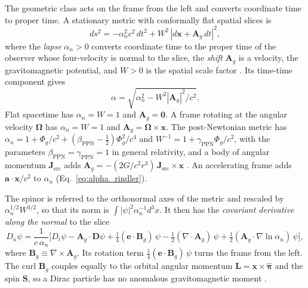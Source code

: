 \documentclass[aps,prd,onecolumn,tightenlines,nofootinbib,notitlepage,11pt,floatfix]{revtex4-2}
\theoremstyle{indentedtheorem}
\begin{document}
The geometric class acts on the frame from the left and converts coordinate time to proper time. A stationary metric with conformally flat spatial slices is
\begin{equation}
    ds^2 = -\alpha_n^2c^2\,dt^2 + W^2\,|d\mathbf{x}+\mathbf{A}_g\,dt|^2 ,
    \label{eq:lapse_shift_metric}
\end{equation}
where the \emph{lapse} $\alpha_n>0$ converts coordinate time to the proper time of the observer whose four-velocity is normal to the slice, the \emph{shift} $\mathbf{A}_g$ is a velocity, the gravitomagnetic potential, and $W>0$ is the spatial scale factor \citep{Arnowitt2008Dynamics,MTW1973Gravitation}. Its time-time component gives
\begin{equation}
    \alpha = \sqrt{\alpha_n^2 - W^2|\mathbf{A}_g|^2/c^2} .
    \label{eq:alpha_lapse_shift}
\end{equation}
Flat spacetime has $\alpha_n=W=1$ and $\mathbf{A}_g=\mathbf{0}$. A frame rotating at the angular velocity $\boldsymbol{\Omega}$ has $\alpha_n=W=1$ and $\mathbf{A}_g=\boldsymbol{\Omega}\times\mathbf{x}$. The post-Newtonian metric has $\alpha_n=1+\Phi_g/c^2+(\beta_\text{PPN}-\tfrac{1}{2})\Phi_g^2/c^4$ and $W^{-1}=1+\gamma_\text{PPN}\Phi_g/c^2$, with the parameters $\beta_\text{PPN}=\gamma_\text{PPN}=1$ in general relativity, and a body of angular momentum $\mathbf{J}_\text{src}$ adds $\mathbf{A}_g=-(2G/c^2r^3)\,\mathbf{J}_\text{src}\times\mathbf{x}$ \citep{Will2014Confrontation}. An accelerating frame adds $\mathbf{a}\cdot\mathbf{x}/c^2$ to $\alpha_n$ (Eq.~\eqref{eq:alpha_rindler}).

The spinor is referred to the orthonormal axes of the metric and rescaled by $\alpha_n^{1/2}W^{3/2}$, so that its norm is $\int|\psi|^2\alpha_n^{-1}d^3x$. It then has the \emph{covariant derivative along the normal} to the slice
\begin{equation}
    D_n\psi = \frac{1}{c\,\alpha_n}\big[D_t\psi - \mathbf{A}_g\cdot\mathbf{D}\psi + \tfrac{1}{4}(\mathbf{e}\cdot\mathbf{B}_g)\,\psi - \tfrac{1}{2}(\nabla\cdot\mathbf{A}_g)\,\psi + \tfrac{1}{2}(\mathbf{A}_g\cdot\nabla\ln\alpha_n)\,\psi\big] ,
    \label{eq:normal_derivative}
\end{equation}
where $\mathbf{B}_g\equiv\nabla\times\mathbf{A}_g$. Its rotation term $\tfrac{1}{4}(\mathbf{e}\cdot\mathbf{B}_g)\,\psi$ turns the frame from the left. The curl $\mathbf{B}_g$ couples equally to the orbital angular momentum $\mathbf{L}=\mathbf{x}\times\hat{\boldsymbol{\pi}}$ and the spin $\mathbf{S}$, so a Dirac particle has no anomalous gravitomagnetic moment \citep{KobzarevOkun1963Gravitational,HehlNi1990Inertial}.
\end{document}
